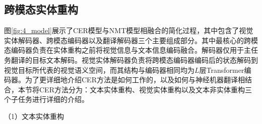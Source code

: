 

\subsection{跨模态实体重构}
\label{sec:4_cer}

图\ref{fig:4_model}展示了CER模型与NMT模型相融合的简化过程，其中包含了视觉实体解码器、跨模态编码器以及翻译解码器三个主要组成部分。其中最核心的跨模态编码器负责在实体重构之前将视觉信息与文本信息编码融合。解码器仅用于主任务翻译的目标文本解码。视觉实体解码器负责将跨模态编码器编码后的状态解码到视觉目标所代表的视觉语义空间，而其结构与编码器相同均为$L$层Transformer编码器。为了更详细地介绍CER方法是如何工作的，以及如何与神经机器翻译相结合，本节将CER方法分为：文本实体重构、视觉实体重构以及文本非实体重构三个子任务进行详细的介绍。

{\sffamily （1）文本实体重构}

